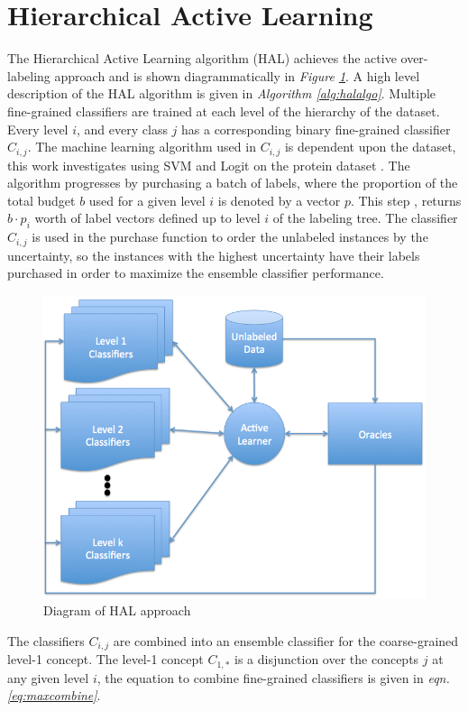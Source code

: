 \documentclass[ms]{nuthesis}
\begin{document}
\section{Hierarchical Active Learning}
\par The Hierarchical Active Learning algorithm (HAL) achieves the active over-labeling
approach and is shown diagrammatically in \textit{Figure \ref{fig:HALapproach}}.
A high level description of the HAL algorithm is given in
\textit{Algorithm \ref{alg:halalgo}}.
Multiple fine-grained classifiers are trained at each level of the hierarchy of the dataset.
 Every level $i$, and every class $j$ has a corresponding binary fine-grained
 classifier $C_{i,j}$. The machine learning algorithm used in $C_{i,j}$ is
 dependent upon the dataset, this work investigates using SVM and Logit
 on the protein dataset \cite{bioPoster}. The algorithm progresses by
 purchasing a batch of labels, where the proportion of the total budget $b$
 used for a given level $i$ is denoted by a vector $p$. This step
 , returns $b \cdot p_i$ worth
  of label vectors defined up to level $i$ of the labeling tree. The
  classifier $C_{i,j}$ is used in the purchase function to order the
  unlabeled instances by the uncertainty, so the instances with the
  highest uncertainty have their labels purchased in order to maximize
  the ensemble classifier performance.

\FloatBarrier
\begin{figure}[!htb]
	\centering
    \includegraphics[width=0.65\columnwidth]{fig/AL2}
    \caption{Diagram of HAL approach}
    \label{fig:HALapproach}
\end{figure}
\FloatBarrier





The classifiers $C_{i,j}$ are combined into an ensemble classifier for
the coarse-grained level-1 concept. The level-1 concept $C_{1,*}$ is a
disjunction over
the concepts $j$ at any given level $i$, the equation to combine fine-grained
classifiers is given in \textit{eqn. \ref{eq:maxcombine}}.
\end{document}
